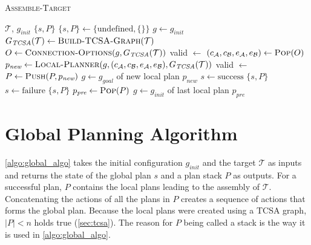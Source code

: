 \vfill

\begin{algorithm}
	\caption{\scshape Assemble-Target}
	\label{algo:global_algo}
	\begin{algorithmic}[1]
		\REQUIRE $\mathcal{T}$, $g_\textit{init}$ 
		\ENSURE $\{s,P\}$ 
		\STATE $\{s,P\} \gets \{\text{undefined}, \{\}\}$
		\STATE $g \gets g_\textit{init}$ 
		\STATE $G_{\textit{TCSA}}(\mathcal{T}) \gets \text{\scshape Build-TCSA-Graph}(\mathcal{T})$
		\LOOP
			\STATE $O \gets \text{\scshape Connection-Options}(g, G_{\textit{TCSA}}(\mathcal{T}))$
			\STATE valid $\gets$ \FALSE
				\STATE $(c_\mathcal{A}, c_\mathcal{B}, e_\mathcal{A}, e_\mathcal{B}) \gets \text{\scshape Pop}(O)$
				\STATE $p_\textit{new} \gets \text{\scshape Local-Planner}(g, (c_\mathcal{A}, c_\mathcal{B}, e_\mathcal{A}, e_\mathcal{B}), G_{\textit{TCSA}}(\mathcal{T}))$
					\STATE valid $\gets$ \TRUE
				\ENDIF
			\ENDWHILE
				\STATE $P \gets \text{\scshape Push}(P, p_\textit{new})$ 
				\STATE $g \gets g_\textit{goal}$ of new local plan $p_\textit{new}$ 
					\STATE $s \gets \text{success}$
					\RETURN $\{s, P\}$
				\ENDIF
			\ELSE
					\STATE $s \gets \text{failure}$
					\RETURN $\{s, P\}$
				\ENDIF
				\STATE $p_\textit{pre} \gets \text{\scshape Pop}(P)$ 
				\STATE $g \gets g_\textit{init}$ of last local plan $p_\textit{pre}$ 
			\ENDIF
		\ENDLOOP
	\end{algorithmic}
\end{algorithm}

\newpage

\section{Global Planning Algorithm}
\label{sec:global_algo}

\autoref{algo:global_algo} takes the initial configuration $g_\textit{init}$ and the target $\mathcal{T}$ as inputs and returns the state of the global plan $s$ and a plan stack $P$ as outputs.
For a successful plan, $P$ contains the local plans leading to the assembly of $\mathcal{T}$.
Concatenating the actions of all the plans in $P$ creates a sequence of actions that forms the global plan.
Because the local plans were created using a TCSA graph, $|P| < n$ holds true (\autoref{sec:tcsa}).
The reason for $P$ being called a stack is the way it is used in \autoref{algo:global_algo}.

